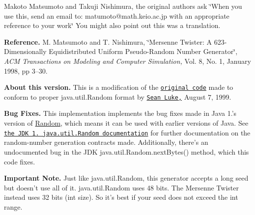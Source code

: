 Makoto Matsumoto and Takuji Nishimura, the original authors ask \char`\"{}\-When you use this, send an email to\-: matumoto@math.\-keio.\-ac.\-jp
with an appropriate reference to your work\char`\"{} You might also point out this was a translation. 

{\bfseries Reference. } M. Matsumoto and T. Nishimura, \char`\"{}\-Mersenne Twister\-: A 623-\/\-Dimensionally Equidistributed Uniform
\-Pseudo-\/\-Random Number Generator\char`\"{}, {\itshape A\-C\-M Transactions on Modeling and Computer Simulation,} Vol. 8, No. 1, January 1998, pp 3--30.

{\bfseries About this version. } This is a modification of the \href{http://www.theorem.com/java/index.htm#Mersenne}{\tt original code} made to conform to proper java.\-util.\-Random format by \href{http://www.cs.umd.edu/users/seanl/}{\tt Sean Luke,} August 7, 1999.

{\bfseries Bug Fixes. }This implementation implements the bug fixes made in Java 1.'s version of \hyperlink{classjenes_1_1utils_1_1_random}{Random}, which means it can be used with earlier versions of Java. See \href{http://www.javasoft.com/products/jdk/1.2/docs/api/java/util/Random.html}{\tt the J\-D\-K 1. java.\-util.\-Random documentation} for further documentation on the random-\/number generation contracts made. Additionally, there's an undocumented bug in the J\-D\-K java.\-util.\-Random.\-next\-Bytes() method, which this code fixes.

{\bfseries Important Note. } Just like java.\-util.\-Random, this generator accepts a long seed but doesn't use all of it. java.\-util.\-Random uses 48 bits. The Mersenne Twister instead uses 32 bits (int size). So it's best if your seed does not exceed the int range. 

